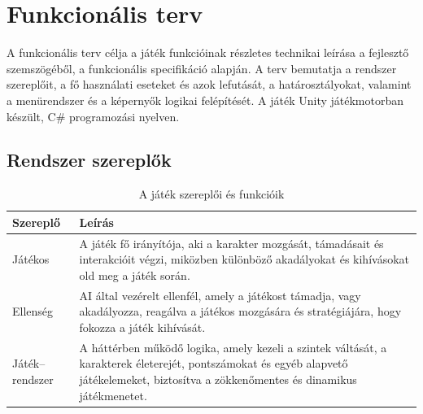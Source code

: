 \documentclass[
]{thesis-ekf}
\theoremstyle{definition}
\theoremstyle{remark}
\begin{document}
\section{Funkcionális terv}
A funkcionális terv célja a játék funkcióinak részletes technikai leírása a fejlesztő szemszögéből, a funkcionális specifikáció alapján. A terv bemutatja a rendszer szereplőit, a fő használati eseteket és azok lefutását, a határosztályokat, valamint a menürendszer és a képernyők logikai felépítését. A játék Unity játékmotorban készült, C\# programozási nyelven.

\subsection{Rendszer szereplők}
\begin{table}[h!]
	\centering
	\begin{tabular}{|p{2cm}|p{11cm}|}
		\hline
		\textbf{Szereplő} & \textbf{Leírás} \\
		\hline
		Játékos &A játék fő irányítója, aki a karakter mozgását, támadásait és interakcióit végzi, miközben különböző akadályokat és kihívásokat old meg a játék során. \\
		\hline
		Ellenség &AI által vezérelt ellenfél, amely a játékost támadja, vagy akadályozza, reagálva a játékos mozgására és stratégiájára, hogy fokozza a játék kihívását. \\
		\hline
		Játék--rendszer & A háttérben működő logika, amely kezeli a szintek váltását, a karakterek életerejét, pontszámokat és egyéb alapvető játékelemeket, biztosítva a zökkenőmentes és dinamikus játékmenetet. \\
		\hline
	\end{tabular}
	\caption{A játék szereplői és funkcióik}
\end{table}
\end{document}
